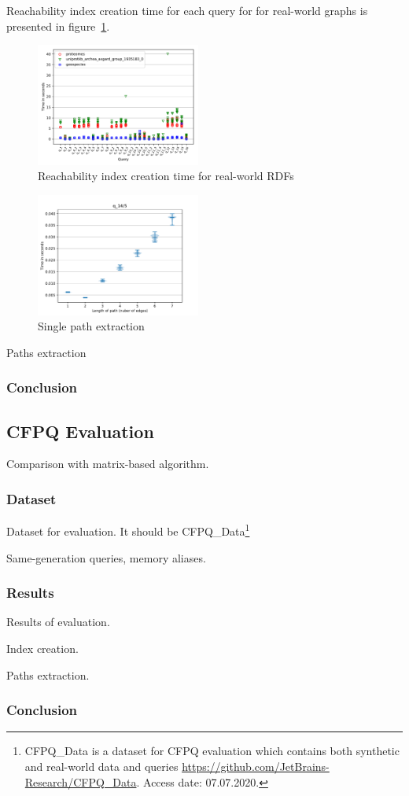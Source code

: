 Reachability index creation time for each query for for real-world graphs is presented in figure~\ref{fig:other_all_qs}.

\begin{figure}
   \includegraphics[width=0.48\textwidth]{data/other_all.pdf}
   \caption{Reachability index creation time for real-world RDFs}
   \label{fig:other_all_qs}
\end{figure}


\begin{figure}
   \includegraphics[width=0.48\textwidth]{data/res_graphics/q_14_5.pdf}
   \caption{Single path extraction}
\end{figure}

Paths extraction

\subsubsection{Conclusion}

\subsection{CFPQ Evaluation}

Comparison with matrix-based algorithm.

\subsubsection{Dataset}

Dataset for evaluation. 
It should be CFPQ\_Data\footnote{CFPQ\_Data is a dataset for CFPQ evaluation which contains both synthetic and real-world data and queries \url{https://github.com/JetBrains-Research/CFPQ\_Data}. Access date: 07.07.2020.}

Same-generation queries, memory aliases.

\subsubsection{Results}

Results of evaluation.

Index creation.

Paths extraction.

\subsubsection{Conclusion}
